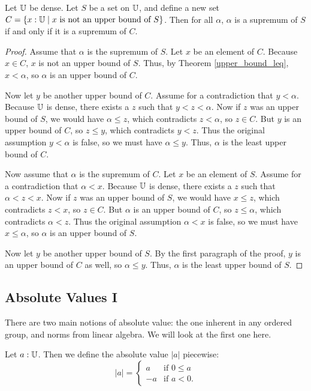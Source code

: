 \documentclass[../../math.tex]{subfiles}
\begin{document}
\begin{theorem}
    Let $\mathbb{U}$ be dense.  Let $S$ be a set on $\mathbb{U}$, and define a new set $C = \{x
    : \mathbb{U} \mid \text{$x$ is not an upper bound of $S$}\}$.  Then for all
    $\alpha$, $\alpha$ is a supremum of $S$ if and only if it is a supremum of
    $C$.
\end{theorem}
\begin{proof}
    Assume that $\alpha$ is the supremum of $S$.  Let $x$ be an element of $C$.
    Because $x \in C$, $x$ is not an upper bound of $S$.  Thus, by Theorem
    \ref{upper_bound_leq}, $x < \alpha$, so $\alpha$ is an upper bound of $C$.

    Now let $y$ be another upper bound of $C$.  Assume for a contradiction that
    $y < \alpha$.  Because $\mathbb{U}$ is dense, there exists a $z$ such that $y < z <
    \alpha$.  Now if $z$ was an upper bound of $S$, we would have $\alpha \leq
    z$, which contradicts $z < \alpha$, so $z \in C$.  But $y$ is an upper bound
    of $C$, so $z \leq y$, which contradicts $y < z$.  Thus the original
    assumption $y < \alpha$ is false, so we must have $\alpha \leq y$.  Thus,
    $\alpha$ is the least upper bound of $C$.

    Now assume that $\alpha$ is the supremum of $C$.  Let $x$ be an element of
    $S$.  Assume for a contradiction that $\alpha < x$.  Because $\mathbb{U}$ is dense,
    there exists a $z$ such that $\alpha < z < x$.  Now if $z$ was an upper
    bound of $S$, we would have $x \leq z$, which contradicts $z < x$, so $z \in
    C$.  But $\alpha$ is an upper bound of $C$, so $z \leq \alpha$, which
    contradicts $\alpha < z$.  Thus the original assumption $\alpha < x$ is
    false, so we must have $x \leq \alpha$, so $\alpha$ is an upper bound of
    $S$.

    Now let $y$ be another upper bound of $S$.  By the first paragraph of the
    proof, $y$ is an upper bound of $C$ as well, so $\alpha \leq y$.  Thus,
    $\alpha$ is the least upper bound of $S$.
\end{proof}

\subsection{Absolute Values I}

There are two main notions of absolute value: the one inherent in any ordered
group, and norms from linear algebra.  We will look at the first one here.

\begin{definition}
    Let $a : \mathbb{U}$.  Then we define the absolute value $|a|$ piecewise:
    \[
        |a| = \begin{cases}
            a & \text{if $0 \leq a$} \\
            -a & \text{if $a < 0$.}
        \end{cases}
    \]
\end{definition}
\end{document}
